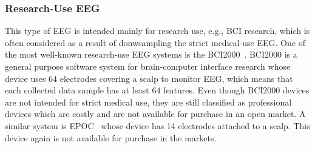 \subsubsection{Research-Use EEG}
This type of EEG is intended mainly for research use, e.g., BCI research, which is often considered as a result of donwsampling the strict medical-use EEG. One of the most well-known research-use EEG systems is the BCI2000~\cite{schalk2004bci2000}. BCI2000 is a general purpose software system for brain-computer interface research whose device uses 64 electrodes covering a scalp to monitor EEG, which means that each collected data sample has at least 64 features. %
Even though BCI2000 devices are not intended for strict medical use, they are still classified as professional devices which are costly and are not available for purchase in an open market. A similar system is EPOC~\cite{stytsenko2011evaluation} whose device has 14 electrodes attached to a scalp. This device again is not available for purchase in the markets. %


